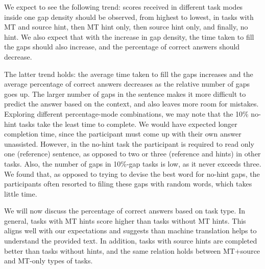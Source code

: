 \documentclass[11pt]{article}
\begin{document}
We expect to see the following trend: scores received in different task modes inside one gap density should be observed, from highest to lowest, in tasks with MT and source hint, then MT hint only, then source hint only, and finally, no hint. We also expect that with the increase in gap density, the time taken to fill the gaps should also increase, and the percentage of correct answers should decrease. 

The latter trend holds: the average time taken to fill the gaps increases and the average percentage of correct answers decreases as the relative number of gaps goes up. The larger number of gaps in the sentence makes it more
difficult to predict the answer based on the context, and also leaves more room for
mistakes. Exploring different percentage-mode combinations, we may note that the 10\% no-hint tasks take the least time to complete. We would have expected longer completion time, since the participant must come up with their own answer unassisted. However, in the no-hint task the participant is required to read only one (reference) sentence, as opposed to two or three (reference and hints) in other tasks. Also, the number of gaps in 10\%-gap tasks is low, as it never exceeds three. We found that, as opposed to trying to devise the best word for no-hint gaps, the participants often resorted to filing these gaps with random words, which takes little time.

We will now discuss the percentage of correct answers based on task type. In general, tasks with MT hints score higher than tasks without MT hints. This aligns well with our expectations and suggests than machine translation helps to understand the provided text. In addition, tasks with source hints are completed better than tasks without hints, and the same relation holds between MT+source and MT-only types of tasks. 
\end{document}
